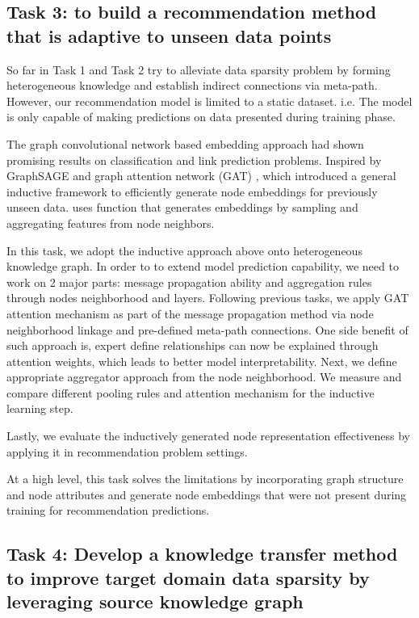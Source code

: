 \subsection*{Task 3: to build a recommendation method that is adaptive to unseen data points}

So far in Task 1 and Task 2 try to alleviate data sparsity problem by forming heterogeneous knowledge and establish indirect connections via meta-path. However, our recommendation model is limited to a static dataset. i.e. The model is only capable of making predictions on data presented during training phase. 

The graph convolutional network based embedding approach had shown promising results on classification and link prediction problems. Inspired by GraphSAGE \citep{hamilton2017inductive} and graph attention network (GAT) \citep{velivckovic2017graph}, which introduced a general inductive framework to efficiently generate node embeddings for previously unseen data. \citet{hamilton2017inductive} uses function that generates embeddings by sampling and aggregating features from node neighbors.

In this task, we adopt the inductive approach above onto heterogeneous knowledge graph. In order to to extend model prediction capability, we need to work on 2 major parts: message propagation ability and aggregation rules through nodes neighborhood and layers. 
Following previous tasks, we apply GAT attention mechanism as part of the message propagation method via node neighborhood linkage and pre-defined meta-path connections. One side benefit of such approach is, expert define relationships can now be explained through attention weights, which leads to better model interpretability.
Next, we define appropriate aggregator approach from the node neighborhood. We measure and compare different pooling rules and attention mechanism for the inductive learning step.

Lastly, we evaluate the inductively generated node representation effectiveness by applying it in recommendation problem settings. 

At a high level, this task solves the limitations by incorporating graph structure and node attributes and generate node embeddings that were not present during training for recommendation predictions.


\subsection*{Task 4: Develop a knowledge transfer method to improve target domain data sparsity by leveraging source knowledge graph }

